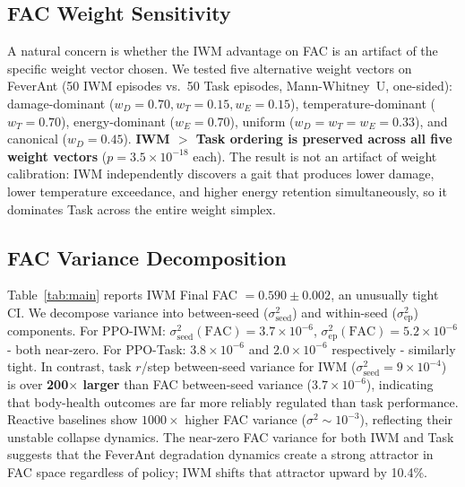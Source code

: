 \documentclass{article}
\begin{document}
{\subsection{FAC Weight Sensitivity}
\label{app:fac_sensitivity}
A natural concern is whether the IWM advantage on FAC is an artifact of the specific weight vector chosen. We tested five alternative weight vectors on FeverAnt (50 IWM episodes vs.\ 50 Task episodes, Mann-Whitney~U, one-sided): damage-dominant ($w_D\!=\!0.70, w_T\!=\!0.15, w_E\!=\!0.15$), temperature-dominant ($w_T\!=\!0.70$), energy-dominant ($w_E\!=\!0.70$), uniform ($w_D\!=\!w_T\!=\!w_E\!=\!0.33$), and canonical ($w_D\!=\!0.45$). \textbf{IWM $>$ Task ordering is preserved across all five weight vectors} ($p\!=\!3.5\!\times\!10^{-18}$ each). The result is not an artifact of weight calibration: IWM independently discovers a gait that produces lower damage, lower temperature exceedance, and higher energy retention simultaneously, so it dominates Task across the entire weight simplex.

\vspace{-6pt}
\subsection{FAC Variance Decomposition}
\label{app:fac_variance}
Table~\ref{tab:main} reports IWM Final FAC $= 0.590 \pm 0.002$, an unusually tight CI. We decompose variance into between-seed ($\sigma^2_\text{seed}$) and within-seed ($\sigma^2_\text{ep}$) components. For PPO-IWM: $\sigma^2_\text{seed}(\text{FAC})\!=\!3.7\!\times\!10^{-6}$, $\sigma^2_\text{ep}(\text{FAC})\!=\!5.2\!\times\!10^{-6}$ - both near-zero. For PPO-Task: $3.8\!\times\!10^{-6}$ and $2.0\!\times\!10^{-6}$ respectively - similarly tight. In contrast, task $r$/step between-seed variance for IWM ($\sigma^2_\text{seed}\!=\!9\!\times\!10^{-4}$) is over \textbf{200$\times$ larger} than FAC between-seed variance ($3.7\!\times\!10^{-6}$), indicating that body-health outcomes are far more reliably regulated than task performance. Reactive baselines show $1000\!\times$ higher FAC variance ($\sigma^2 \sim 10^{-3}$), reflecting their unstable collapse dynamics. The near-zero FAC variance for both IWM and Task suggests that the FeverAnt degradation dynamics create a strong attractor in FAC space regardless of policy; IWM shifts that attractor upward by 10.4\%.

\vspace{-6pt}
}
\end{document}
